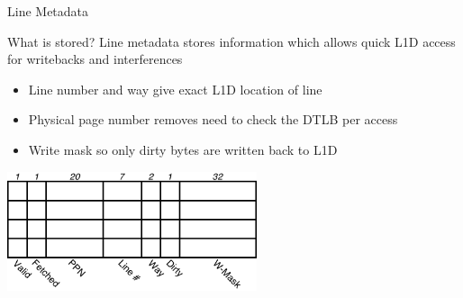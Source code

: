 \documentclass{beamer}
\begin{document}
\begin{frame}{Line Metadata}
   \begin{block}{What is stored?}
      Line metadata stores information which allows quick L1D access for
      writebacks and interferences
      \begin{itemize}
         \item Line number and way give exact L1D location of line
         \item Physical page number removes need to check the DTLB per access
         \item Write mask so only dirty bytes are written back to L1D
      \end{itemize}
   \end{block}
   \begin{center}
      \includegraphics[width=0.55\textwidth]{figures/linemeta.pdf}
   \end{center}
\end{frame}
\end{document}
